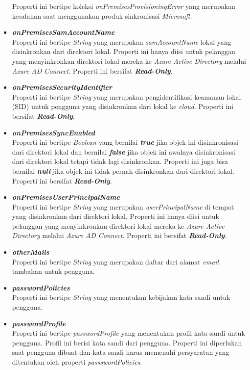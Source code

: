 \begin{itemize}
	Properti ini bertipe koleksi \textit{onPremisesProvisioningError} yang merupakan kesalahan saat menggunakan produk sinkronisasi \textit{Microsoft}.
	 \item \textbf{\textit{onPremisesSamAccountName}}\\
	Properti ini bertipe \textit{String} yang merupakan \textit{samAccountName} lokal yang disinkronkan dari direktori lokal. Properti ini hanya diisi untuk pelanggan yang menyinkronkan direktori lokal mereka ke \textit{Azure Active Directory} melalui \textit{Azure AD Connect}. Properti ini bersifat \textbf{\textit{Read-Only}}.
	\item \textbf{\textit{onPremisesSecurityIdentifier}}\\
	Properti ini bertipe \textit{String} yang merupakan pengidentifikasi keamanan lokal (SID) untuk pengguna yang disinkronkan dari lokal ke \textit{cloud}. Properti ini bersifat \textbf{\textit{Read-Only}}.
	\item \textbf{\textit{onPremisesSyncEnabled}}\\
	Properti ini bertipe \textit{Boolean} yang bernilai \textbf{\textit{true}} jika objek ini disinkronisasi dari direktori lokal dan bernilai \textbf{\textit{false}} jika objek ini awalnya disinkronisasi dari direktori lokal tetapi tidak lagi disinkronkan. Properti ini juga bisa bernilai \textbf{\textit{null}} jika objek ini tidak pernah disinkronkan dari direktori lokal. Properti ini bersifat \textbf{\textit{Read-Only}}.
	\item \textbf{\textit{onPremisesUserPrincipalName}}\\
	Properti ini bertipe \textit{String} yang merupakan \textit{userPrincipalName} di tempat yang disinkronkan dari direktori lokal. Properti ini hanya diisi untuk pelanggan yang menyinkronkan direktori lokal mereka ke \textit{Azure Active Directory} melalui \textit{Azure AD Connect}. Properti ini bersifat \textbf{\textit{Read-Only}}.
	\item \textbf{\textit{otherMails}}\\
	Properti ini bertipe \textit{String} yang merupakan daftar dari alamat \textit{email} tambahan untuk pengguna.
	\item \textbf{\textit{passwordPolicies}}\\
	Properti ini bertipe \textit{String} yang menentukan kebijakan kata sandi untuk pengguna. 
	\item \textbf{\textit{passwordProfile}}\\
	Properti ini bertipe \textit{passwordProfile} yang menentukan profil kata sandi untuk pengguna. Profil ini berisi kata sandi dari pengguna. Properti ini diperlukan saat pengguna dibuat dan kata sandi harus memenuhi persyaratan yang ditentukan oleh properti \textit{passswordPolicies}.

\end{itemize}
